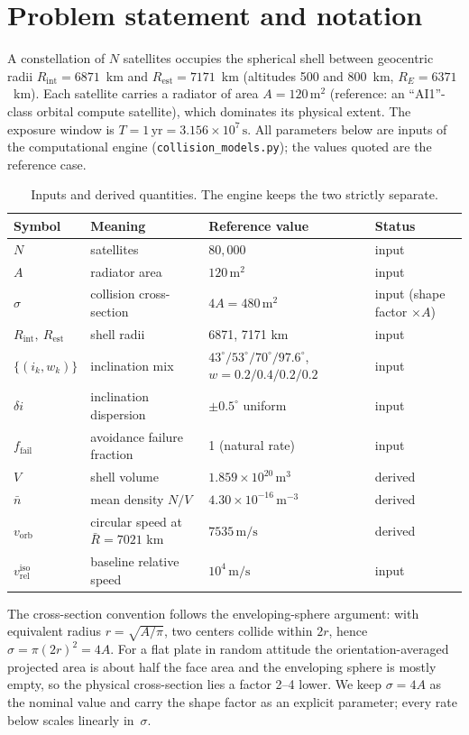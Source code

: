 \documentclass[11pt,a4paper]{article}
\newcommand{\vrel}{v_{\mathrm{rel}}}
\newcommand{\vorb}{v_{\mathrm{orb}}}
\newcommand{\Rint}{R_{\mathrm{int}}}
\newcommand{\Rest}{R_{\mathrm{est}}}
\newcommand{\Rbar}{\bar{R}}
\newcommand{\nbar}{\bar{n}}
\begin{document}
\section{Problem statement and notation}

A constellation of $N$ satellites occupies the spherical shell between geocentric radii
$\Rint = 6871$~km and $\Rest = 7171$~km (altitudes 500 and 800~km, $R_E = 6371$~km).
Each satellite carries a radiator of area $A = 120\,\mathrm{m}^2$ (reference: an
``AI1''-class orbital compute satellite), which dominates its physical extent. The
exposure window is $T = 1\,\mathrm{yr} = 3.156\times10^{7}\,\mathrm{s}$. All
parameters below are inputs of the computational engine
(\texttt{collision\_models.py}); the values quoted are the reference case.

\begin{table}[h]\centering\small
\begin{tabular}{llll}
\toprule
Symbol & Meaning & Reference value & Status \\
\midrule
$N$ & satellites & $80{,}000$ & input \\
$A$ & radiator area & $120\,\mathrm{m}^2$ & input \\
$\sigma$ & collision cross-section & $4A = 480\,\mathrm{m}^2$ & input (shape factor $\times A$) \\
$\Rint,\ \Rest$ & shell radii & 6871, 7171 km & input \\
$\{(i_k, w_k)\}$ & inclination mix & $43^\circ/53^\circ/70^\circ/97.6^\circ$, $w = 0.2/0.4/0.2/0.2$ & input \\
$\delta i$ & inclination dispersion & $\pm0.5^\circ$ uniform & input \\
$f_{\mathrm{fail}}$ & avoidance failure fraction & 1 (natural rate) & input \\
$V$ & shell volume & $1.859\times10^{20}\,\mathrm{m}^3$ & derived \\
$\nbar$ & mean density $N/V$ & $4.30\times10^{-16}\,\mathrm{m}^{-3}$ & derived \\
$\vorb$ & circular speed at $\Rbar = 7021$ km & $7535\,\mathrm{m/s}$ & derived \\
$\vrel^{\mathrm{iso}}$ & baseline relative speed & $10^4\,\mathrm{m/s}$ & input \\
\bottomrule
\end{tabular}
\caption{Inputs and derived quantities. The engine keeps the two strictly separate.}
\end{table}

The cross-section convention follows the enveloping-sphere argument: with equivalent
radius $r = \sqrt{A/\pi}$, two centers collide within $2r$, hence $\sigma = \pi (2r)^2
= 4A$. For a flat plate in random attitude the orientation-averaged projected area is
about half the face area and the enveloping sphere is mostly empty, so the physical
cross-section lies a factor 2--4 lower. We keep $\sigma = 4A$ as the nominal value and
carry the shape factor as an explicit parameter; every rate below scales linearly
in~$\sigma$.
\end{document}

